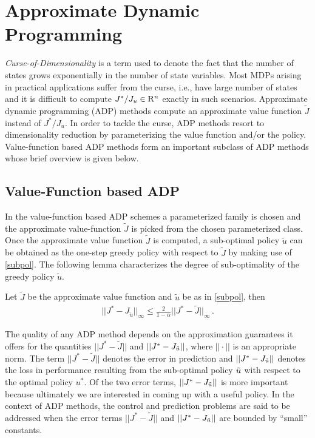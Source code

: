 \section{Approximate Dynamic Programming}
\emph{Curse-of-Dimensionality} is a term used to denote the fact that the number of states grows exponentially in the number of state variables. 
Most MDPs arising in practical applications suffer from the curse, i.e., have large number of states and it is difficult to compute $J^*/J_u\in \mathrm{R}^n$ exactly in such scenarios. Approximate dynamic programming (ADP) \cite{lspi,lspe,ALP,wang2014approximate} methods compute an approximate value function $\tilde{J}$ instead of $J^*/J_u$. In order to tackle the curse, ADP methods resort to dimensionality reduction by parameterizing the value function and/or the policy. Value-function based ADP methods form an important subclass of ADP methods whose brief overview is given below.
\subsection{Value-Function based ADP}
In the value-function based ADP schemes a parameterized family is chosen and the approximate value-function $\tilde{J}$ is picked from the chosen parameterized class.
Once the approximate value function $\tilde{J}$ is computed, a sub-optimal policy $\tilde{u}$ can be obtained as the one-step greedy policy with respect to $\tilde{J}$ by making use of \eqref{subpol}.
The following lemma characterizes the degree of sub-optimality of the greedy policy $\tilde{u}$.
\begin{lemma}\label{subopt}
Let $\tilde{J}$ be the approximate value function and $\tilde{u}$ be as in \eqref{subpol}, then 
\begin{align}
||J^*-J_{\tilde{u}}||_\infty \leq \frac{2}{1-\alpha}||J^*-\tilde{J}||_\infty\,.
\end{align}
\end{lemma}
The quality of any ADP method depends on the approximation guarantees it offers for the quantities $||J^*-\tilde{J}||$ and $||J^*-J_{\tilde{u}}||$, where $||\cdot||$ is an appropriate norm. The term  $||J^*-\tilde{J}||$ denotes the error in prediction and $||J^*-J_{\tilde{u}}||$ denotes the loss in performance resulting from the sub-optimal policy $\tilde{u}$ with respect to the optimal policy $u^*$. Of the two error terms, $||J^*-J_{\tilde{u}}||$ is more important because ultimately we are interested in coming up with a useful policy. In the context of ADP methods, the control and prediction problems are said to be addressed when the error terms $||J^*-\tilde{J}||$ and $||J^*-J_{\tilde{u}}||$ are bounded by ``small'' constants.\\
